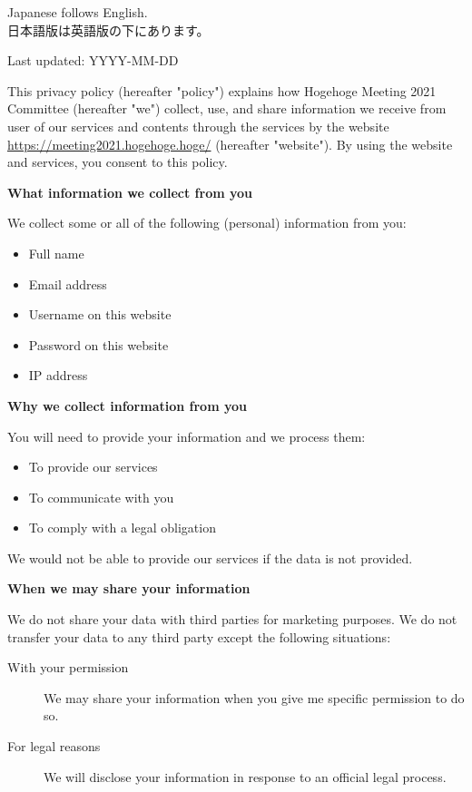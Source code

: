 \documentclass[titlepage,10pt,a4paper,uplatex]{jsbook}
\newenvironment{content}{\begin{shaded}\vspace{-1em}\raggedright\ttfamily\footnotesize\setlength{\baselineskip}{1.4em}}{\end{shaded}\vspace{-1em}}
\renewcommand{\textbf}[1]{{\bfseries\sffamily#1}}
\begin{document}
\begin{content}
Japanese follows English.\\
日本語版は英語版の下にあります。

Last updated: YYYY-MM-DD

This privacy policy (hereafter "policy") explains how Hogehoge Meeting 2021 Committee (hereafter "we") collect, use, and share information we receive from user of our services and contents through the services by the website \url{https://meeting2021.hogehoge.hoge/} (hereafter "website"). By using the website and services, you consent to this policy.

\textbf{\Large What information we collect from you}

We collect some or all of the following (personal) information from you:

\begin{itemize}
\item Full name
\item Email address
\item Username on this website
\item Password on this website
\item IP address
\end{itemize}

\textbf{\Large Why we collect information from you}

You will need to provide your information and we process them:

\begin{itemize}
\item To provide our services
\item To communicate with you
\item To comply with a legal obligation
\end{itemize}

We would not be able to provide our services if the data is not provided.

\textbf{\Large When we may share your information}

We do not share your data with third parties for marketing purposes. We do not transfer your data to any third party except the following situations:

\begin{description}
\item[With your permission] We may share your information when you give me specific permission to do so.
\item[For legal reasons] We will disclose your information in response to an official legal process.
\end{description}


\end{content}
\end{document}
